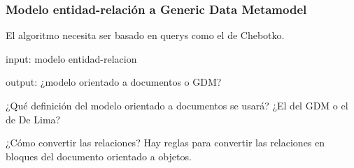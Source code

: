 \subsubsection{Modelo entidad-relación a Generic Data Metamodel}


El algoritmo necesita ser basado en querys como el de Chebotko.


input: modelo entidad-relacion


output: ¿modelo orientado a documentos o GDM?


¿Qué definición del modelo orientado a documentos se usará? ¿El del GDM o el de De Lima?


¿Cómo convertir las relaciones?
Hay reglas para convertir las relaciones en bloques del documento orientado a objetos.
